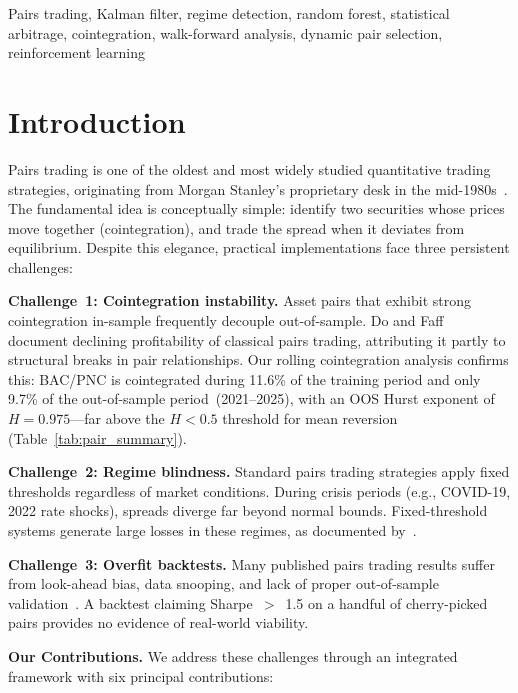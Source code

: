 \documentclass{ieeeaccess}
\begin{document}
\begin{IEEEkeywords}
Pairs trading, Kalman filter, regime detection, random forest, statistical arbitrage, cointegration, walk-forward analysis, dynamic pair selection, reinforcement learning
\end{IEEEkeywords}

\section{Introduction}

Pairs trading is one of the oldest and most widely studied quantitative trading strategies, originating from Morgan Stanley's proprietary desk in the mid-1980s~\cite{vidyamurthy2004pairs}.
The fundamental idea is conceptually simple: identify two securities whose prices move together (cointegration), and trade the spread when it deviates from equilibrium.
Despite this elegance, practical implementations face three persistent challenges:

\textbf{Challenge~1: Cointegration instability.}
Asset pairs that exhibit strong cointegration in-sample frequently decouple out-of-sample.
Do and Faff~\cite{do2010does} document declining profitability of classical pairs trading, attributing it partly to structural breaks in pair relationships.
Our rolling cointegration analysis confirms this: BAC/PNC is cointegrated during 11.6\% of the training period and only 9.7\% of the out-of-sample period~(2021--2025), with an OOS Hurst exponent of $H = 0.975$---far above the $H < 0.5$ threshold for mean reversion (Table~\ref{tab:pair_summary}).

\textbf{Challenge~2: Regime blindness.}
Standard pairs trading strategies apply fixed thresholds regardless of market conditions.
During crisis periods (e.g., COVID-19, 2022 rate shocks), spreads diverge far beyond normal bounds.
Fixed-threshold systems generate large losses in these regimes, as documented by~\cite{rad2016profitability}.

\textbf{Challenge~3: Overfit backtests.}
Many published pairs trading results suffer from look-ahead bias, data snooping, and lack of proper out-of-sample validation~\cite{harvey2016crosssection}.
A backtest claiming Sharpe~$>$~1.5 on a handful of cherry-picked pairs provides no evidence of real-world viability.

\smallskip
\noindent\textbf{Our Contributions.}
We address these challenges through an integrated framework with six principal contributions:
\end{document}
